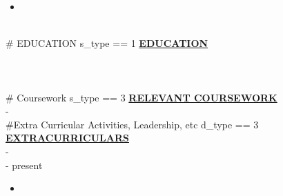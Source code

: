 \documentclass{article}
\begin{document}
\begin{itemize}[noitemsep,nolistsep,leftmargin=*]
    \item {}
\end{itemize}
        ~\\
\#{ EDUCATION s_type == 1 }
\noindent \textbf{\underline{EDUCATION}} \\
\textbf{} \\
 \hfill {} \\
\textit{}\\
\#{ Coursework s_type == 3 }
\noindent \textbf{\underline{RELEVANT COURSEWORK}}\\
\textbf{} - \\
\#{Extra Curricular Activities, Leadership, etc d_type == 3}
\noindent \textbf{\underline{EXTRACURRICULARS}} \\
\noindent \textbf{} \hfill {} - \\
\noindent \textbf{} \hfill {} - present\\
\begin{itemize}[noitemsep,nolistsep,leftmargin=*]
    \item {}
\end{itemize}
        ~\\
\end{document}
